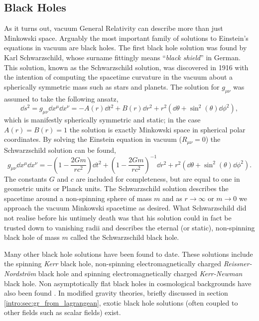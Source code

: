 \subsection{Black Holes}\label{intro:sec:bh_theory}
 As it turns out, vacuum General Relativity can describe more than just Minkowski space. Arguably the most important family of solutions to Einstein's equations in vacuum are black holes. The first black hole solution was found by Karl Schwarzschild, whose surname fittingly means {\enquote{\it black shield}} in German. This solution, known as the Schwarzschild solution, was discovered in 1916 with the intention of computing the spacetime curvature in the vacuum about a spherically symmetric mass such as stars and planets. The solution for $g_{\mu\nu}$ was assumed to take the following ansatz,
 \begin{equation} \label{intro:eq:sc_ansatz}
\dd s^2 = g_{\mu\nu} \dd x^\mu \dd x^\nu= -A(r) \dd t^2 + B(r) \dd r^2 + r^2 \left(\dd \theta + \sin^2(\theta) \dd \phi^2\right),
 \end{equation}
which is manifestly spherically symmetric and static; in the case $A(r)=B(r)=1$ the solution is exactly Minkowski space in spherical polar coordinates. By solving the Einstein equation in vacuum ($R_{\mu\nu} = 0$) the Schwarzschild solution can be found,
 \begin{equation}
 g_{\mu\nu} \dd x^\mu \dd x^\nu= -\left(1-\frac{2Gm}{rc^2}\right) \dd t^2 + \left(1-\frac{2Gm}{rc^2}\right)^{-1} \dd r^2 + r^2 \left(\dd \theta + \sin^2(\theta) \dd \phi^2\right).
 \end{equation}
The constants $G$ and $c$ are included for completeness, but are equal to one in geometric units or Planck units. The Schwarzschild solution describes the spacetime around a non-spinning sphere of mass $m$ and as $r\rightarrow \infty$ or $m\rightarrow 0$ we approach the vacuum Minkowski spacetime as desired. What Schwarzschild did not realise before his untimely death was that his solution could in fact be trusted down to vanishing radii and describes the eternal (or static), non-spinning black hole of mass $m$ called the Schwarzschild black hole.

Many other black hole solutions have been found to date. These solutions include the spinning {\it Kerr} black hole, non-spinning electromagnetically charged {\it Reissner-Nordström} black hole and spinning electromagnetically charged {\it Kerr-Newman} black hole. Non asymptotically flat black holes in cosmological backgrounds have also been found \cite{mcvittie1933mass}. In modified gravity theories, briefly discussed in section \ref{intro:sec:gr_from_lagrangean}, exotic black hole solutions (often coupled to other fields such as scalar fields) exist.


